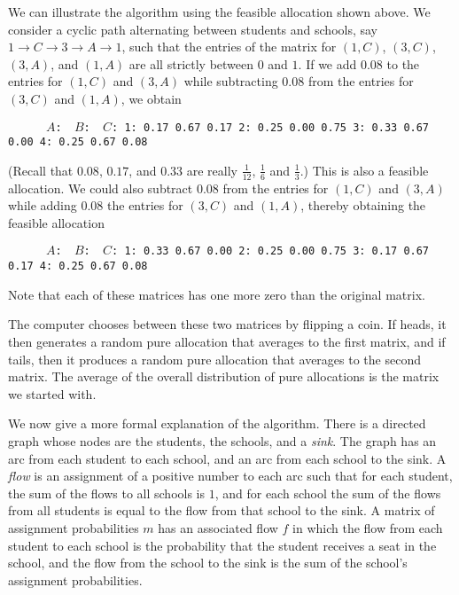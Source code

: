\documentclass[12pt]{article}
\theoremstyle{definition}
\begin{document}
We can illustrate the algorithm using the feasible allocation shown
above.  We consider a cyclic path alternating between students and
schools, say $1 \to C \to 3 \to A \to 1$, such that the entries of the
matrix for $(1,C)$, $(3,C)$, $(3,A)$, and $(1,A)$ are all strictly
between $0$ and $1$.  If we add $0.08$ to the entries for $(1,C)$ and
$(3,A)$ while subtracting $0.08$ from the entries for $(3,C)$ and
$(1,A)$, we obtain
\begin{obeylines}\texttt{
\ \ \ \ \ $A$:    \     $B$:  \  $C$:
1:      0.17     0.67     0.17
2:      0.25     0.00     0.75
3:      0.33     0.67     0.00
4:      0.25     0.67     0.08
}
\end{obeylines} \noindent
(Recall that $0.08$, $0.17$, and $0.33$ are really $\tfrac{1}{12}$,
$\tfrac16$ and $\tfrac13$.)  This is also a feasible allocation.  We
could also subtract $0.08$ from the entries for $(1,C)$ and $(3,A)$
while adding $0.08$ the entries for $(3,C)$ and $(1,A)$, thereby
obtaining the feasible allocation
\begin{obeylines}\texttt{
\ \ \ \ \ $A$:    \     $B$:  \      $C$:
1:      0.33     0.67     0.00
2:      0.25     0.00     0.75
3:      0.17     0.67     0.17
4:      0.25     0.67     0.08
}
\end{obeylines} \noindent
Note that each of these matrices has one more zero than the original matrix.

The computer chooses between these two matrices by flipping a coin.
If heads, it then generates a random pure allocation that averages to
the first matrix, and if tails, then it produces a random pure
allocation that averages to the second matrix.  The average of the
overall distribution of pure allocations is the matrix we started
with.

We now give a more formal explanation of the algorithm.  There is a
directed graph whose nodes are the students, the schools, and a
\emph{sink}.  The graph has an arc from each student to each school,
and an arc from each school to the sink.  A \emph{flow} is an
assignment of a positive number to each arc such that for each
student, the sum of the flows to all schools is $1$, and for each
school the sum of the flows from all students is equal to the flow
from that school to the sink.  A matrix of assignment probabilities
$m$ has an associated flow $f$ in which the flow from each student to
each school is the probability that the student receives a seat in the
school, and the flow from the school to the sink is the sum of the
school's assignment probabilities.
\end{document}
